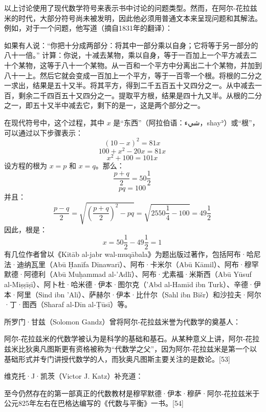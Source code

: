 以上讨论使用了现代数学符号来表示书中讨论的问题类型。然而，在阿尔-花拉兹米的时代，大部分符号尚未被发明，因此他必须用普通文本来呈现问题和其解法。例如，对于一个问题，他写道（摘自1831年的翻译）：

如果有人说：“你把十分成两部分：将其中一部分乘以自身；它将等于另一部分的八十一倍。” 计算：你说，十减去某物，乘以自身，等于一百加上一个平方减去二十个某物，这等于八十一个某物。从一百和一个平方中分离出二十个某物，并加到八十一上。然后它就会变成一百加上一个平方，等于一百零一个根。将根的二分之一求出，结果是五十又半。将其平方，得到二千五百五十又四分之一。从中减去一百，剩余二千四百五十又四分之一。提取平方根，结果是四十九又半。从根的二分之一，即五十又半中减去它，剩下的是一，这是两个部分之一。

在现代符号中，这个过程，其中 \(x\) 是“东西”（阿拉伯语：شيء，shayʾ）或“根”，可以通过以下步骤表示：
\[
(10 - x)^2 = 81x~
\]
\[
100 + x^2 - 20x = 81x~
\]
\[
x^2 + 100 = 101x~
\]
设方程的根为 \(x = p\) 和 \(x = q\)。那么：
\[
\frac{p + q}{2} = 50 \frac{1}{2}~
\]
\[
pq = 100~
\]
并且：
\[
\frac{p - q}{2} = \sqrt{\left(\frac{p + q}{2}\right)^2 - pq} = \sqrt{2550 \frac{1}{4} - 100} = 49 \frac{1}{2}~
\]
因此，根是：
\[
x = 50 \frac{1}{2} - 49 \frac{1}{2} = 1~
\]
有几位作者曾以《Kitāb al-jabr wal-muqābala》为题出版过著作，包括阿布·哈尼法·迪纳瓦里（Abū Ḥanīfa Dīnawarī）、阿布·卡米尔（Abū Kāmil）、阿布·穆罕默德·阿德利（Abū Muḥammad al-'Adlī）、阿布·尤素福·米斯西（Abū Yūsuf al-Miṣṣīṣī）、阿卜杜·哈米德·伊本·图尔克（'Abd al-Hamīd ibn Turk）、辛德·伊本·阿里（Sind ibn 'Alī）、萨赫尔·伊本·比什尔（Sahl ibn Bišr）和沙拉夫·阿尔·丁·图西（Sharaf al-Dīn al-Ṭūsī）等。

所罗门·甘兹（Solomon Gandz）曾将阿尔-花拉兹米誉为代数学的奠基人：

阿尔-花拉兹米的代数学被认为是科学的基础和基石。从某种意义上讲，阿尔-花拉兹米比狄奥凡图斯更有资格被称为“代数学之父”，因为阿尔-花拉兹米是第一个以基础形式并专门讲授代数学的人，而狄奥凡图斯主要关注的是数论。[53]

维克托·J·凯茨（Victor J. Katz）补充道：

至今仍然存在的第一部真正的代数教材是穆罕默德·伊本·穆萨·阿尔-花拉兹米于公元825年左右在巴格达编写的《代数与平衡》一书。[54]